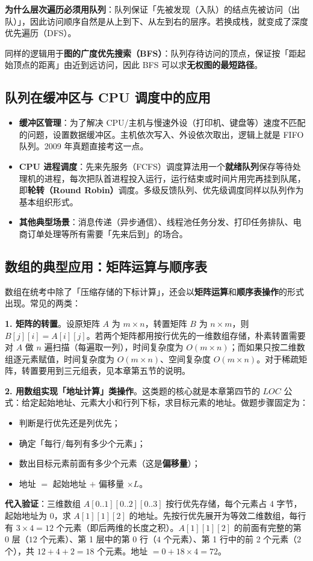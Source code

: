 \documentclass[11pt,openany,UTF8]{ctexbook}
\begin{document}
\textbf{为什么层次遍历必须用队列}：队列保证「先被发现（入队）的结点先被访问（出队）」，因此访问顺序自然是从上到下、从左到右的层序。若换成栈，就变成了深度优先遍历（DFS）。

同样的逻辑用于\textbf{图的广度优先搜索（BFS）}：队列存待访问的顶点，保证按「距起始顶点的距离」由近到远访问，因此 BFS 可以求\textbf{无权图的最短路径}。

\subsection{队列在缓冲区与 CPU 调度中的应用}

\begin{itemize}
\item \textbf{缓冲区管理}：为了解决 CPU/主机与慢速外设（打印机、键盘等）速度不匹配的问题，设置数据缓冲区。主机依次写入、外设依次取出，逻辑上就是 FIFO 队列。2009 年真题直接考这一点。
\item \textbf{CPU 进程调度}：先来先服务（FCFS）调度算法用一个\textbf{就绪队列}保存等待处理机的进程，每次把队首进程投入运行，运行结束或时间片用完再挂到队尾，即\textbf{轮转（Round Robin）}调度。多级反馈队列、优先级调度同样以队列作为基本组织形式。
\item \textbf{其他典型场景}：消息传递（异步通信）、线程池任务分发、打印任务排队、电商订单处理等所有需要「先来后到」的场合。
\end{itemize}
\subsection{数组的典型应用：矩阵运算与顺序表}

数组在统考中除了「压缩存储的下标计算」，还会以\textbf{矩阵运算}和\textbf{顺序表操作}的形式出现。常见的两类：

\textbf{1. 矩阵的转置}。设原矩阵 $A$ 为 $m \times n$，转置矩阵 $B$ 为 $n \times m$，则 $B[j][i] = A[i][j]$。若两个矩阵都用按行优先的一维数组存储，朴素转置需要对 $A$ 做 $n$ 遍扫描（每遍取一列），时间复杂度为 $O(m \times n)$；而如果只按二维数组逐元素赋值，时间复杂度为 $O(m \times n)$、空间复杂度 $O(m \times n)$。对于稀疏矩阵，转置要用到三元组表，见本章第五节的说明。

\textbf{2. 用数组实现「地址计算」类操作}。这类题的核心就是本章第四节的 $LOC$ 公式：给定起始地址、元素大小和行列下标，求目标元素的地址。做题步骤固定为：

\begin{itemize}
\item 判断是行优先还是列优先；
\item 确定「每行/每列有多少个元素」；
\item 数出目标元素前面有多少个元素（这是\textbf{偏移量}）；
\item 地址 $=$ 起始地址 $+$ 偏移量 $\times L$。
\end{itemize}
\textbf{代入验证}：三维数组 $A[0..1][0..2][0..3]$ 按行优先存储，每个元素占 4 字节，起始地址为 0，求 $A[1][1][2]$ 的地址。先按行优先展开为等效二维数组，每行有 $3 \times 4 = 12$ 个元素（即后两维的长度之积）。$A[1][1][2]$ 的前面有完整的第 0 层（$12$ 个元素）、第 1 层中的第 0 行（$4$ 个元素）、第 1 行中的前 2 个元素（$2$ 个），共 $12 + 4 + 2 = 18$ 个元素。地址 $= 0 + 18 \times 4 = 72$。
\end{document}
